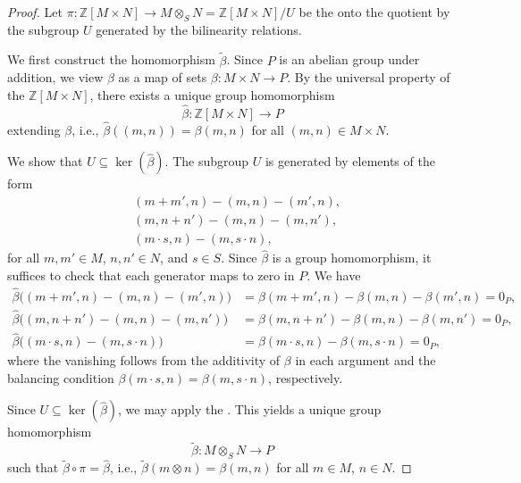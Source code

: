 \begin{proof}
    Let $\pi : \mathbb{Z}[M \times N] \to M \otimes_S N = \mathbb{Z}[M \times N]/U$ be the  onto the quotient by the subgroup $U$ generated by the bilinearity relations.

    We first construct the homomorphism $\widetilde{\beta}$. Since $P$ is an abelian group under addition, we view $\beta$ as a map of sets $\beta : M \times N \to P$. By the universal property of the  $\mathbb{Z}[M \times N]$, there exists a unique group homomorphism
    $$\hat{\beta} : \mathbb{Z}[M \times N] \to P$$
    extending $\beta$, i.e., $\hat{\beta}((m,n)) = \beta(m,n)$ for all $(m,n) \in M \times N$.

    We show that $U \subseteq \operatorname{ker}(\hat{\beta})$. The subgroup $U$ is generated by elements of the form
    \begin{align*}
    &(m+m',n) - (m,n) - (m',n), \\
    &(m,n+n') - (m,n) - (m,n'), \\
    &(m \cdot s, n) - (m, s \cdot n),
    \end{align*}
    for all $m,m' \in M$, $n,n' \in N$, and $s \in S$. Since $\hat{\beta}$ is a group homomorphism, it suffices to check that each generator maps to zero in $P$. We have
    \begin{align*}
    \hat{\beta}\bigl((m+m',n) - (m,n) - (m',n)\bigr) &= \beta(m+m',n) - \beta(m,n) - \beta(m',n) = 0_P, \\
    \hat{\beta}\bigl((m,n+n') - (m,n) - (m,n')\bigr) &= \beta(m,n+n') - \beta(m,n) - \beta(m,n') = 0_P, \\
    \hat{\beta}\bigl((m \cdot s, n) - (m, s \cdot n)\bigr) &= \beta(m \cdot s, n) - \beta(m, s \cdot n) = 0_P,
    \end{align*}
    where the vanishing follows from the additivity of $\beta$ in each argument and the balancing condition $\beta(m \cdot s, n) = \beta(m, s \cdot n)$, respectively.

    Since $U \subseteq \operatorname{ker}(\hat{\beta})$, we may apply the . This yields a unique group homomorphism
    $$\widetilde{\beta} : M \otimes_S N \to P$$
    such that $\widetilde{\beta} \circ \pi = \hat{\beta}$, i.e., $\widetilde{\beta}(m \otimes n) = \beta(m,n)$ for all $m \in M$, $n \in N$.


\end{proof}
